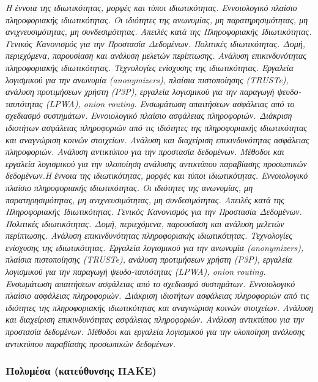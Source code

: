 \emph{Η έννοια της ιδιωτικότητας, μορφές και τύποι ιδιωτικότητας.
Εννοιολογικό πλαίσιο πληροφοριακής ιδιωτικότητας. Οι ιδιότητες της
ανωνυμίας, μη παρατηρησιμότητας, μη ανιχνευσιμότητας, μη συνδεσιμότητας.
Απειλές κατά της Πληροφοριακής Ιδιωτικότητας. Γενικός Κανονισμός για την
Προστασία Δεδομένων. Πολιτικές ιδιωτικότητας. Δομή, περιεχόμενα,
παρουσίαση και ανάλυση μελετών περίπτωσης. Ανάλυση επικινδυνότητας
πληροφοριακής ιδιωτικότητας. Τεχνολογίες ενίσχυσης της ιδιωτικότητας.
Εργαλεία λογισμικού για την ανωνυμία (anonymizers), πλαίσια πιστοποίησης
(TRUSTe), ανάλυση προτιμήσεων χρήστη (P3P), εργαλεία λογισμικού για την
παραγωγή ψευδο-ταυτότητας (LPWA), onion routing. Ενσωμάτωση απαιτήσεων
ασφάλειας από το σχεδιασμό συστημάτων. Εννοιολογικό πλαίσιο ασφάλειας
πληροφοριών. Διάκριση ιδιοτήτων ασφάλειας πληροφοριών από τις ιδιότητες
της πληροφοριακής ιδιωτικότητας και αναγνώριση κοινών στοιχείων. Ανάλυση
και διαχείριση επικινδυνότητας ασφάλειας πληροφοριών. Ανάλυση αντικτύπου
για την προστασία δεδομένων. Μέθοδοι και εργαλεία λογισμικού για την
υλοποίηση ανάλυσης αντικτύπου παραβίασης προσωπικών δεδομένων.Η έννοια
της ιδιωτικότητας, μορφές και τύποι ιδιωτικότητας. Εννοιολογικό πλαίσιο
πληροφοριακής ιδιωτικότητας. Οι ιδιότητες της ανωνυμίας, μη
παρατηρησιμότητας, μη ανιχνευσιμότητας, μη συνδεσιμότητας. Απειλές κατά
της Πληροφοριακής Ιδιωτικότητας. Γενικός Κανονισμός για την Προστασία
Δεδομένων. Πολιτικές ιδιωτικότητας. Δομή, περιεχόμενα, παρουσίαση και
ανάλυση μελετών περίπτωσης. Ανάλυση επικινδυνότητας πληροφοριακής
ιδιωτικότητας. Τεχνολογίες ενίσχυσης της ιδιωτικότητας. Εργαλεία
λογισμικού για την ανωνυμία (anonymizers), πλαίσια πιστοποίησης
(TRUSTe), ανάλυση προτιμήσεων χρήστη (P3P), εργαλεία λογισμικού για την
παραγωγή ψευδο-ταυτότητας (LPWA), onion routing. Ενσωμάτωση απαιτήσεων
ασφάλειας από το σχεδιασμό συστημάτων. Εννοιολογικό πλαίσιο ασφάλειας
πληροφοριών. Διάκριση ιδιοτήτων ασφάλειας πληροφοριών από τις ιδιότητες
της πληροφοριακής ιδιωτικότητας και αναγνώριση κοινών στοιχείων. Ανάλυση
και διαχείριση επικινδυνότητας ασφάλειας πληροφοριών. Ανάλυση αντικτύπου
για την προστασία δεδομένων. Μέθοδοι και εργαλεία λογισμικού για την
υλοποίηση ανάλυσης αντικτύπου παραβίασης προσωπικών δεδομένων.}

\hypertarget{ux3c0ux3bfux3bbux3c5ux3bcux3adux3c3ux3b1-ux3baux3b1ux3c4ux3b5ux3cdux3b8ux3c5ux3bdux3c3ux3b7ux3c2-ux3c0ux3b1ux3baux3b5}{%
\subsubsection{Πολυμέσα (κατεύθυνσης
ΠΑΚΕ)}\label{ux3c0ux3bfux3bbux3c5ux3bcux3adux3c3ux3b1-ux3baux3b1ux3c4ux3b5ux3cdux3b8ux3c5ux3bdux3c3ux3b7ux3c2-ux3c0ux3b1ux3baux3b5}}

